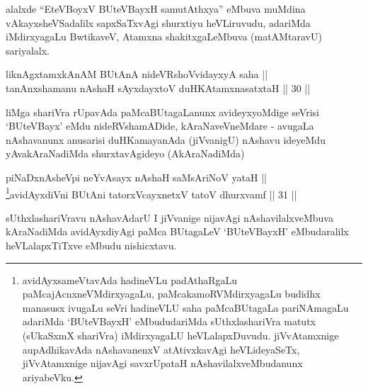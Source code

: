 \begin{artha}
alalxde ``EteVBoyxV BUteVBayxH samutAthxya'' eMbuva muMdina vAkayxsheVSadalilx sapxSaTxvAgi
shurxtiyu heVLiruvudu, adariMda iMdirxyagaLu BwtikaveV,
Atamxna shakitxgaLeMbuva (matAMtaravU) sariyalalx.
\end{artha}


\begin{shl}
liknAgxtamxkAnAM BUtAnA nideVRshoV\s vidayxyA saha || \\
tanAnxshamanu nAshaH sAyxdayxtoV duHKAtamxnasatxtaH \hfill || 30 ||
  
\end{shl}

\begin{artha}
liMga shariVra rUpavAda paMcaBUtagaLanunx avideyxyoMdige seVrisi
`BUteVBayx' eMdu nideRVshamADide, kAraNaveVneMdare - avugaLa
nAshavanunx anusarisi duHKamayanAda (jiVvanigU) nAshavu ideyeMdu
yAvakAraNadiMda shurxtavAgideyo (AkAraNadiMda)
\end{artha}


\begin{shl}
piNaDxnAsheV\s pi neYvAsayx nAshaH saMsAriNoV yataH || \\
\footnote{avidAyxsameVtavAda hadineVLu padAthaRgaLu paMcajAcnxneVMdirxyagaLu, paMcakamoRVMdirxyagaLu budidhx manasusx ivugaLu seVri hadineVLU saha paMcaBUtagaLa pariNAmagaLu adariMda `BUteVBayxH' eMbududariMda sUthxlashariVra matutx (sUkaSxmX shariVra) iMdirxyagaLU heVLalapxDuvudu. jiVvAtamxnige aupAdhikavAda nAshavanenxV atAtivxkavAgi heVLideyaSeTx, jiVvAtamxnige nijavAgi savxrUpataH nAshavilalxveMbudanunx ariyabeVku.}avidAyxdiVni BUtAni tatorxVcayxnetxV tatoV dhurxvamf \hfill || 31 ||
  
\end{shl}


\begin{artha}
sUthxlashariVravu nAshavAdarU I jiVvanige nijavAgi
nAshavilalxveMbuva kAraNadiMda avidAyxdiyAgi paMca BUtagaLeV
`BUteVBayxH' eMbudaralilx heVLalapxTiTxve eMbudu nishicxtavu.
\end{artha}




